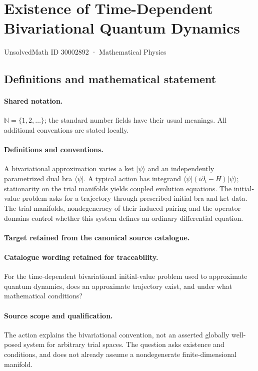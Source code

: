 \documentclass[11pt]{article}
\begin{document}
\setcounter{section}{30002891}
\section{Existence of Time-Dependent Bivariational Quantum Dynamics}\label{30002892}
{\small UnsolvedMath ID 30002892 · Mathematical Physics}
\subsection{Definitions and mathematical statement}

\paragraph{Shared notation.}$\mathbb N=\{1,2,\ldots\}$; the standard number fields have their usual meanings. All additional conventions are stated locally.


\paragraph{Definitions and conventions.}
A bivariational approximation varies a ket $|\psi\rangle$ and an independently parametrized dual bra $\langle\widetilde\psi|$. A typical action has integrand $\langle\widetilde\psi|(i\partial_t-H)|\psi\rangle$; stationarity on the trial manifolds yields coupled evolution equations. The initial-value problem asks for a trajectory through prescribed initial bra and ket data. The trial manifolds, nondegeneracy of their induced pairing and the operator domains control whether this system defines an ordinary differential equation.

\paragraph{Target retained from the canonical source catalogue.}
\paragraph{Catalogue wording retained for traceability.}
For the time-dependent bivariational initial-value problem used to approximate quantum dynamics, does an approximate trajectory exist, and under what mathematical conditions?

\paragraph{Source scope and qualification.}
The action explains the bivariational convention, not an asserted globally well-posed system for arbitrary trial spaces. The question asks existence and conditions, and does not already assume a nondegenerate finite-dimensional manifold.
\end{document}
